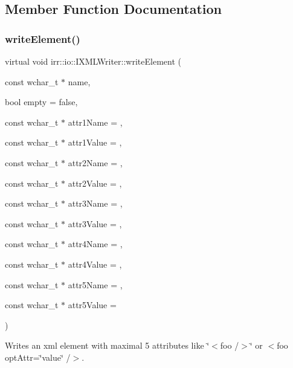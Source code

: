 \subsection{Member Function Documentation}
\mbox{\label{classirr_1_1io_1_1IXMLWriter_a09ffde58db20f23b7eba1bf08e1daf42}} 
\subsubsection{\texorpdfstring{write\+Element()}{writeElement()}}
{\footnotesize\ttfamily virtual void irr\+::io\+::\+I\+X\+M\+L\+Writer\+::write\+Element (\begin{DoxyParamCaption}\item[{const wchar\+\_\+t $\ast$}]{name,  }\item[{bool}]{empty = {\ttfamily false},  }\item[{const wchar\+\_\+t $\ast$}]{attr1\+Name = {},  }\item[{const wchar\+\_\+t $\ast$}]{attr1\+Value = {},  }\item[{const wchar\+\_\+t $\ast$}]{attr2\+Name = {},  }\item[{const wchar\+\_\+t $\ast$}]{attr2\+Value = {},  }\item[{const wchar\+\_\+t $\ast$}]{attr3\+Name = {},  }\item[{const wchar\+\_\+t $\ast$}]{attr3\+Value = {},  }\item[{const wchar\+\_\+t $\ast$}]{attr4\+Name = {},  }\item[{const wchar\+\_\+t $\ast$}]{attr4\+Value = {},  }\item[{const wchar\+\_\+t $\ast$}]{attr5\+Name = {},  }\item[{const wchar\+\_\+t $\ast$}]{attr5\+Value = {} }\end{DoxyParamCaption})\hspace{0.3cm}{\ttfamily [pure virtual]}}



Writes an xml element with maximal 5 attributes like \char`\"{}$<$foo /$>$\char`\"{} or $<$foo opt\+Attr=\char`\"{}value\char`\"{} /$>$. 


